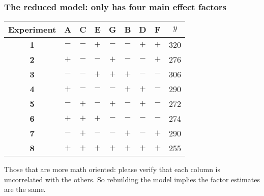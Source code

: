 \begin{frame}\frametitle{The reduced model: only has four main effect factors}
	\renewcommand{\lg}{\color{lightgray}}
	
	\vspace{0.4cm}
	\begin{tabulary}{\linewidth}{c|ccccccc|c}\hline
		\textbf{\relax Experiment} & \textbf{\relax A } & \textbf{\relax C} & \textbf{\relax E } & \textbf{\relax G} & \lg \textbf{\relax B} & \lg \textbf{\relax D} & \lg \textbf{\relax F} & $y$\\ \hline
		\textbf{1} & \(-\) & \(-\) & \(+\) & \(-\) & \lg \(-\) & \lg  \(+\) & \lg  \(+\) & 320\\
		\textbf{2} & \(+\) & \(-\) & \(-\) & \(+\) & \lg \(-\) & \lg  \(-\) & \lg  \(+\) & 276\\
		\textbf{3} & \(-\) & \(-\) & \(+\) & \(+\) & \lg \(+\) & \lg  \(-\) & \lg  \(-\) & 306\\
		\textbf{4} & \(+\) & \(-\) & \(-\) & \(-\) & \lg \(+\) & \lg  \(+\) & \lg  \(-\) & 290\\
		\textbf{5} & \(-\) & \(+\) & \(-\) & \(+\) & \lg \(-\) & \lg  \(+\) & \lg  \(-\) & 272\\
		\textbf{6} & \(+\) & \(+\) & \(+\) & \(-\) & \lg \(-\) & \lg  \(-\) & \lg  \(-\) & 274\\
		\textbf{7} & \(-\) & \(+\) & \(-\) & \(-\) & \lg \(+\) & \lg  \(-\) & \lg  \(+\) & 290\\
		\textbf{8} & \(+\) & \(+\) & \(+\) & \(+\) & \lg \(+\) & \lg  \(+\) & \lg  \(+\) & 255\\ \hline
	\end{tabulary}
	
	\vspace{1cm}
	Those that are more math oriented: please verify that each column is uncorrelated with the others. So rebuilding the model implies the factor estimates are the same.
\end{frame}

